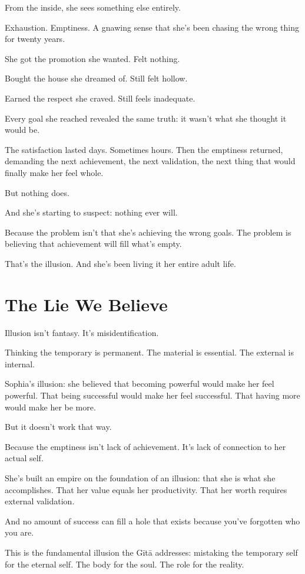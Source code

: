 \documentclass[11pt,twoside]{book}
\begin{document}
From the inside, she sees something else entirely.

Exhaustion. Emptiness. A gnawing sense that she's been chasing the wrong thing for twenty years.

She got the promotion she wanted. Felt nothing.

Bought the house she dreamed of. Still felt hollow.

Earned the respect she craved. Still feels inadequate.

Every goal she reached revealed the same truth: it wasn't what she thought it would be.

The satisfaction lasted days. Sometimes hours. Then the emptiness returned, demanding the next achievement, the next validation, the next thing that would finally make her feel whole.

But nothing does.

And she's starting to suspect: nothing ever will.

Because the problem isn't that she's achieving the wrong goals. The problem is believing that achievement will fill what's empty.

That's the illusion. And she's been living it her entire adult life.

\section*{The Lie We Believe}

Illusion isn't fantasy. It's misidentification.

Thinking the temporary is permanent. The material is essential. The external is internal.

Sophia's illusion: she believed that becoming powerful would make her feel powerful. That being successful would make her feel successful. That having more would make her be more.

But it doesn't work that way.

Because the emptiness isn't lack of achievement. It's lack of connection to her actual self.

She's built an empire on the foundation of an illusion: that she is what she accomplishes. That her value equals her productivity. That her worth requires external validation.

And no amount of success can fill a hole that exists because you've forgotten who you are.

This is the fundamental illusion the Gītā addresses: mistaking the temporary self for the eternal self. The body for the soul. The role for the reality.
\end{document}
